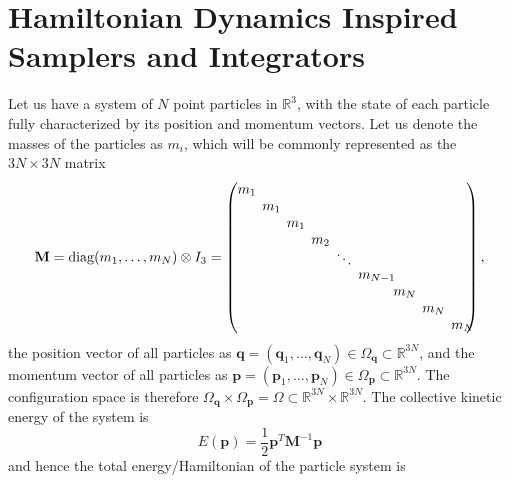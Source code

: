 \section{Hamiltonian Dynamics Inspired Samplers and Integrators}

    Let us have a system of $N$ point particles in $\mathbb{R}^3$, with the state of each particle fully characterized by its position and momentum vectors. Let us denote the masses of the particles as $m_i$, which will be commonly represented as the $3N \times 3N$ matrix  
    \begin{equation}
      \mathbf{M} = \mathrm{diag}(m_1, \ldots, m_N) \otimes I_3 = \begin{pmatrix}
      m_1\hspace{-2mm}& & & & & & & & \\ 
      & m_1\hspace{-2mm}& & & & & & & \\ 
      & & m_1\hspace{-2mm}& & & & & & \\ 
      & & & m_2 \hspace{-2mm}& & & & & \\[-1mm] 
      & & & & \ddots \hspace{-2mm} & & & & \\[-1mm] 
      & & & & & m_{N-1}\hspace{-4mm} & & & \\ 
      & & & & & & m_N \hspace{-2mm}& & \\ 
      & & & & & & & m_N\hspace{-2mm} & \\ 
      & & & & & & & & m_N\hspace{-2mm} \end{pmatrix},
    \end{equation}
    the position vector of all particles as $\mathbf{q} = (\mathbf{q}_1, \ldots, \mathbf{q}_N) \in \Omega_\mathbf{q} \subset \mathbb{R}^{3N}$, and the momentum vector of all particles as $\mathbf{p} = (\mathbf{p}_1, \ldots, \mathbf{p}_N) \in \Omega_\mathbf{p} \subset \mathbb{R}^{3N}$. The configuration space is therefore $\Omega_\mathbf{q} \times \Omega_\mathbf{p} = \Omega \subset \mathbb{R}^{3N} \times \mathbb{R}^{3N}$. The collective kinetic energy of the system is 
    \begin{equation}
      E (\mathbf{p}) = \frac{1}{2} \mathbf{p}^T \mathbf{M}^{-1} \mathbf{p}
    \end{equation}
    and hence the total energy/Hamiltonian of the particle system is 
